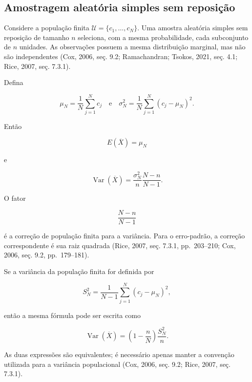 \documentclass[
  letterpaper,
  DIV=11,
  numbers=noendperiod]{scrreprt}
\begin{document}
\subsection{Amostragem aleatória simples sem
reposição}\label{amostragem-aleatuxf3ria-simples-sem-reposiuxe7uxe3o}

Considere a população finita \(\mathcal{U}=\{c_1,\ldots,c_N\}\). Uma
amostra aleatória simples sem reposição de tamanho \(n\) seleciona, com
a mesma probabilidade, cada subconjunto de \(n\) unidades. As
observações possuem a mesma distribuição marginal, mas não são
independentes (Cox, 2006, seç. 9.2; Ramachandran; Tsokos, 2021, seç.
4.1; Rice, 2007, seç. 7.3.1).

Defina

\[\mu_N=\frac{1}{N}\sum_{j=1}^N c_j
\quad\text{e}\quad
\sigma_N^2=\frac{1}{N}\sum_{j=1}^N(c_j-\mu_N)^2.\]

Então

\[E(\overline{X})=\mu_N\]

e

\[\operatorname{Var}(\overline{X})
=
\frac{\sigma_N^2}{n}\frac{N-n}{N-1}.\]

O fator

\[\frac{N-n}{N-1}\]

é a correção de população finita para a variância. Para o erro-padrão, a
correção correspondente é sua raiz quadrada (Rice, 2007, seç. 7.3.1,
pp.~203--210; Cox, 2006, seç. 9.2, pp.~179--181).

\begin{tcolorbox}[enhanced jigsaw, colback=white, leftrule=.75mm, colbacktitle=quarto-callout-warning-color!10!white, breakable, titlerule=0mm, bottomtitle=1mm, title=\textcolor{quarto-callout-warning-color}{\faExclamationTriangle}\hspace{0.5em}{Observação --- Duas convenções para a variância finita}, colframe=quarto-callout-warning-color-frame, toprule=.15mm, opacityback=0, bottomrule=.15mm, opacitybacktitle=0.6, arc=.35mm, toptitle=1mm, rightrule=.15mm, coltitle=black, left=2mm]

Se a variância da população finita for definida por

\[S_N^2=\frac{1}{N-1}\sum_{j=1}^N(c_j-\mu_N)^2,\]

então a mesma fórmula pode ser escrita como

\[\operatorname{Var}(\overline{X})
=
\left(1-\frac{n}{N}\right)\frac{S_N^2}{n}.\]

As duas expressões são equivalentes; é necessário apenas manter a
convenção utilizada para a variância populacional (Cox, 2006, seç. 9.2;
Rice, 2007, seç. 7.3.1).

\end{tcolorbox}
\end{document}
